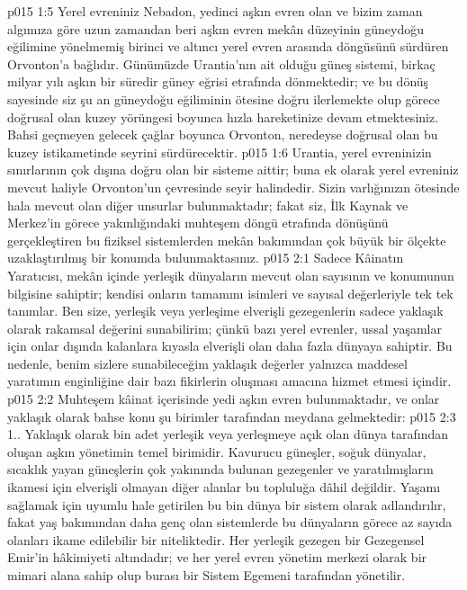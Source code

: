 \vs p015 1:5 Yerel evreniniz Nebadon, yedinci aşkın evren olan ve bizim zaman algımıza göre uzun zamandan beri aşkın evren mekân düzeyinin güneydoğu eğilimine yönelmemiş birinci ve altıncı yerel evren arasında döngüsünü sürdüren Orvonton’a bağlıdır. Günümüzde Urantia’nın ait olduğu güneş sistemi, birkaç milyar yılı aşkın bir süredir güney eğrisi etrafında dönmektedir; ve bu dönüş sayesinde siz şu an güneydoğu eğiliminin ötesine doğru ilerlemekte olup görece doğrusal olan kuzey yörüngesi boyunca hızla hareketinize devam etmektesiniz. Bahsi geçmeyen gelecek çağlar boyunca Orvonton, neredeyse doğrusal olan bu kuzey istikametinde seyrini sürdürecektir.
\vs p015 1:6 Urantia, yerel evreninizin sınırlarının çok dışına doğru olan bir sisteme aittir; buna ek olarak yerel evreniniz mevcut haliyle Orvonton’un çevresinde seyir halindedir. Sizin varlığınızın ötesinde hala mevcut olan diğer unsurlar bulunmaktadır; fakat siz, İlk Kaynak ve Merkez’in görece yakınlığındaki muhteşem döngü etrafında dönüşünü gerçekleştiren bu fiziksel sistemlerden mekân bakımından çok büyük bir ölçekte uzaklaştırılmış bir konumda bulunmaktasınız.
\vs p015 2:1 Sadece Kâinatın Yaratıcısı, mekân içinde yerleşik dünyaların mevcut olan sayısının ve konumunun bilgisine sahiptir; kendisi onların tamamını isimleri ve sayısal değerleriyle tek tek tanımlar. Ben size, yerleşik veya yerleşime elverişli gezegenlerin sadece yaklaşık olarak rakamsal değerini sunabilirim; çünkü bazı yerel evrenler, ussal yaşamlar için onlar dışında kalanlara kıyasla elverişli olan daha fazla dünyaya sahiptir. Bu nedenle, benim sizlere sunabileceğim yaklaşık değerler yalnızca maddesel yaratımın enginliğine dair bazı fikirlerin oluşması amacına hizmet etmesi içindir.
\vs p015 2:2 Muhteşem kâinat içerisinde yedi aşkın evren bulunmaktadır, ve onlar yaklaşık olarak bahse konu şu birimler tarafından meydana gelmektedir:
\vs p015 2:3 1.\bibnobreakspace {}. Yaklaşık olarak bin adet yerleşik veya yerleşmeye açık olan dünya tarafından oluşan aşkın yönetimin temel birimidir. Kavurucu güneşler, soğuk dünyalar, sıcaklık yayan güneşlerin çok yakınında bulunan gezegenler ve yaratılmışların ikamesi için elverişli olmayan diğer alanlar bu topluluğa dâhil değildir. Yaşamı sağlamak için uyumlu hale getirilen bu bin dünya bir sistem olarak adlandırılır, fakat yaş bakımından daha genç olan sistemlerde bu dünyaların görece az sayıda olanları ikame edilebilir bir niteliktedir. Her yerleşik gezegen bir Gezegensel Emir’in hâkimiyeti altındadır; ve her yerel evren yönetim merkezi olarak bir mimari alana sahip olup burası bir Sistem Egemeni tarafından yönetilir.
